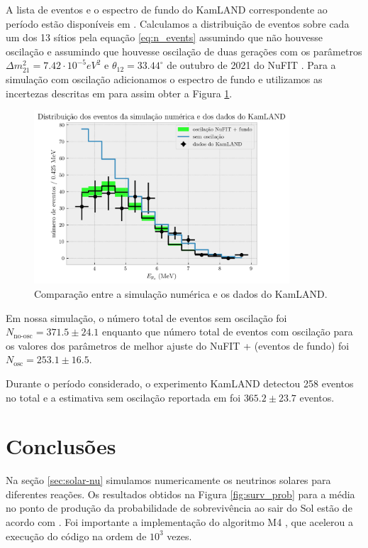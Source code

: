 \documentclass[12pt]{report}
\begin{document}
A lista de eventos e o espectro de fundo do KamLAND correspondente ao período estão disponíveis em \cite{kamland-data}. Calculamos a distribuição de eventos sobre cada um dos 13 sítios pela equação \ref{eq:n_events} assumindo que não houvesse oscilação e assumindo que houvesse oscilação de duas gerações com os parâmetros $\Delta m_{21}^2 = 7.42 \cdot 10^{-5} \unit{eV^2}$ e $\theta_{12} = 33.44^\circ$ de outubro de 2021 do NuFIT \cite{nufit}. Para a simulação com oscilação adicionamos o espectro de fundo e utilizamos as incertezas descritas em \cite{spectral-distortion} para assim obter a Figura \ref{fig:kamland-events}.

\begin{figure}[H]
\centering
\includegraphics[width=0.85\textwidth]{fig/kamland-events.png}
\caption{Comparação entre a simulação numérica e os dados do KamLAND.}
\label{fig:kamland-events}
\end{figure}

Em nossa simulação, o número total de eventos sem oscilação foi $N_{\text{no-osc}} = 371.5 \pm 24.1$ enquanto que número total de eventos com oscilação para os valores dos parâmetros de melhor ajuste do NuFIT + (eventos de fundo) foi $N_{\text{osc}} = 253.1 \pm 16.5$.

Durante o período considerado, o experimento KamLAND detectou 258 eventos no total e a estimativa sem oscilação reportada em \cite{spectral-distortion} foi $365.2 \pm 23.7$ eventos.

\section{Conclusões}

Na seção \ref{sec:solar-nu} simulamos numericamente os neutrinos solares para diferentes reações. Os resultados obtidos na Figura \ref{fig:surv_prob} para a média no ponto de produção da probabilidade de sobrevivência ao sair do Sol estão de acordo com \cite{winslow}. Foi importante a implementação do algoritmo M4 \cite{efficient-nu}, que acelerou a execução do código na ordem de $10^3$ vezes.
\end{document}
